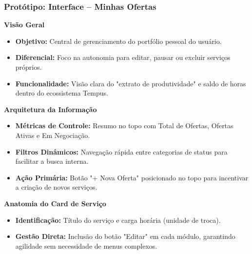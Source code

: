 \documentclass[aspectratio=169]{beamer}
\begin{document}
\begin{frame} 

\frametitle{Protótipo: Interface -- Minhas Ofertas} 

\small 

  

\textbf{Visão Geral} 

\begin{itemize} 

    \item \textbf{Objetivo:} Central de gerenciamento do portfólio pessoal do usuário. 

    \item \textbf{Diferencial:} Foco na autonomia para editar, pausar ou excluir serviços próprios. 

    \item \textbf{Funcionalidade:} Visão clara do "extrato de produtividade" e saldo de horas dentro do ecossistema Tempus. 

\end{itemize} 

  

\vspace{0.2cm} 

\textbf{Arquitetura da Informação} 

\begin{itemize} 

    \item \textbf{Métricas de Controle:} Resumo no topo com Total de Ofertas, Ofertas Ativas e Em Negociação. 

    \item \textbf{Filtros Dinâmicos:} Navegação rápida entre categorias de status para facilitar a busca interna. 

    \item \textbf{Ação Primária:} Botão "+ Nova Oferta" posicionado no topo para incentivar a criação de novos serviços. 

\end{itemize} 

  

\vspace{0.2cm} 

\textbf{Anatomia do Card de Serviço} 

\begin{itemize} 

    \item \textbf{Identificação:} Título do serviço e carga horária (unidade de troca). 

    \item \textbf{Gestão Direta:} Inclusão do botão "Editar" em cada módulo, garantindo agilidade sem necessidade de menus complexos. 

\end{itemize} 

  

\end{frame} 
\end{document}
